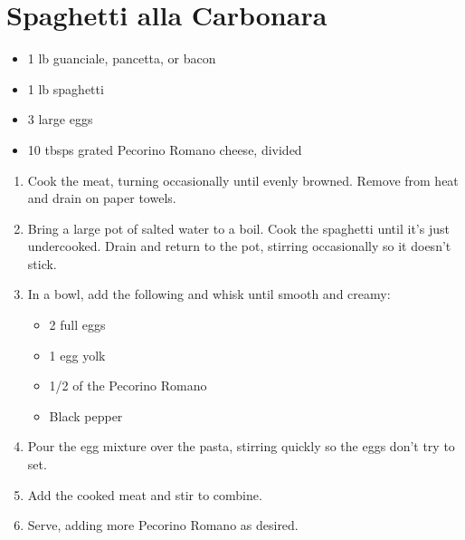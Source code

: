 \section{Spaghetti alla Carbonara}

\begin{itemize}
\item 1 lb guanciale, pancetta, or bacon
\item 1 lb spaghetti
\item 3 large eggs
\item 10 tbsps grated Pecorino Romano cheese, divided
\end{itemize}

\begin{enumerate}
\item Cook the meat, turning occasionally until evenly browned. Remove from heat and drain on paper towels.
\item Bring a large pot of salted water to a boil. Cook the spaghetti until it's just undercooked. Drain and return to
    the pot, stirring occasionally so it doesn't stick.
\item In a bowl, add the following and whisk until smooth and creamy:
\begin{itemize}
    \item 2 full eggs
    \item 1 egg yolk
    \item 1/2 of the Pecorino Romano
    \item Black pepper
\end{itemize}
\item Pour the egg mixture over the pasta, stirring quickly so the eggs don't try to set.
\item Add the cooked meat and stir to combine.
\item Serve, adding more Pecorino Romano as desired.
\end{enumerate}
